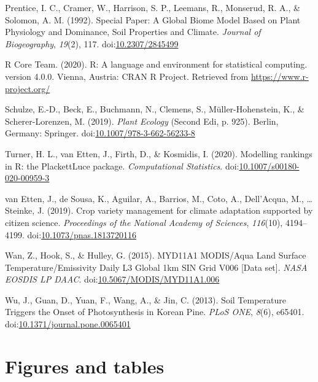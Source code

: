 \documentclass[
]{article}
\newlength{\cslhangindent}
\newenvironment{cslreferences}%
  {\setlength{\parindent}{0pt}%
  \everypar{\setlength{\hangindent}{\cslhangindent}}\ignorespaces}%
  {\par}
\begin{document}
\begin{cslreferences}
\leavevmode\hypertarget{ref-Prentice1992}{}%
Prentice, I. C., Cramer, W., Harrison, S. P., Leemans, R., Monserud, R.
A., \& Solomon, A. M. (1992). Special Paper: A Global Biome Model Based
on Plant Physiology and Dominance, Soil Properties and Climate.
\emph{Journal of Biogeography}, \emph{19}(2), 117.
doi:\href{https://doi.org/10.2307/2845499}{10.2307/2845499}

\leavevmode\hypertarget{ref-RCoreTeam}{}%
R Core Team. (2020). R: A language and environment for statistical
computing. version 4.0.0. Vienna, Austria: CRAN R Project. Retrieved
from \url{https://www.r-project.org/}

\leavevmode\hypertarget{ref-PlantEcology}{}%
Schulze, E.-D., Beck, E., Buchmann, N., Clemens, S., Müller-Hohenstein,
K., \& Scherer-Lorenzen, M. (2019). \emph{Plant Ecology} (Second Edi, p.
925). Berlin, Germany: Springer.
doi:\href{https://doi.org/10.1007/978-3-662-56233-8}{10.1007/978-3-662-56233-8}

\leavevmode\hypertarget{ref-Turner2020}{}%
Turner, H. L., van Etten, J., Firth, D., \& Kosmidis, I. (2020).
Modelling rankings in R: the PlackettLuce package. \emph{Computational
Statistics}.
doi:\href{https://doi.org/10.1007/s00180-020-00959-3}{10.1007/s00180-020-00959-3}

\leavevmode\hypertarget{ref-vanEtten2019}{}%
van Etten, J., de Sousa, K., Aguilar, A., Barrios, M., Coto, A.,
Dell'Acqua, M., \ldots{} Steinke, J. (2019). Crop variety management for
climate adaptation supported by citizen science. \emph{Proceedings of
the National Academy of Sciences}, \emph{116}(10), 4194--4199.
doi:\href{https://doi.org/10.1073/pnas.1813720116}{10.1073/pnas.1813720116}

\leavevmode\hypertarget{ref-Wan2015}{}%
Wan, Z., Hook, S., \& Hulley, G. (2015). MYD11A1 MODIS/Aqua Land Surface
Temperature/Emissivity Daily L3 Global 1km SIN Grid V006 {[}Data set{]}.
\emph{NASA EOSDIS LP DAAC}.
doi:\href{https://doi.org/10.5067/MODIS/MYD11A1.006}{10.5067/MODIS/MYD11A1.006}

\leavevmode\hypertarget{ref-JWu2013}{}%
Wu, J., Guan, D., Yuan, F., Wang, A., \& Jin, C. (2013). Soil
Temperature Triggers the Onset of Photosynthesis in Korean Pine.
\emph{PLoS ONE}, \emph{8}(6), e65401.
doi:\href{https://doi.org/10.1371/journal.pone.0065401}{10.1371/journal.pone.0065401}
\end{cslreferences}

\pagebreak

\hypertarget{figures-and-tables}{%
\section{Figures and tables}\label{figures-and-tables}}
\end{document}
